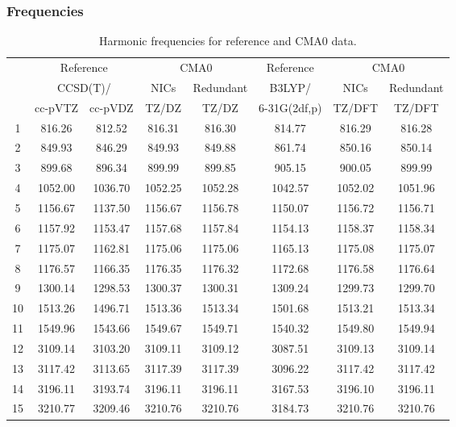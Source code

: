 \documentclass[10pt,oneside]{article}
\begin{document}
\begin{table}[h!]
\subsubsection*{Frequencies}
\centering
\caption{Harmonic frequencies for reference and CMA0 data.}
\begin{tabular}{cccccccc}
\toprule
{} & \multicolumn{2}{c}{Reference} & \multicolumn{2}{c}{CMA0} &    Reference & \multicolumn{2}{c}{CMA0} \\
{} & \multicolumn{2}{c}{CCSD(T)/} &    NICs &  Redundant &       B3LYP/ &    NICs & Redundant \\
{} &   cc-pVTZ & cc-pVDZ &   TZ/DZ &      TZ/DZ & 6-31G(2df,p) &  TZ/DFT &    TZ/DFT \\
\midrule
1  &    816.26 &  812.52 &  816.31 &     816.30 &       814.77 &  816.29 &    816.28 \\
2  &    849.93 &  846.29 &  849.93 &     849.88 &       861.74 &  850.16 &    850.14 \\
3  &    899.68 &  896.34 &  899.99 &     899.85 &       905.15 &  900.05 &    899.99 \\
4  &   1052.00 & 1036.70 & 1052.25 &    1052.28 &      1042.57 & 1052.02 &   1051.96 \\
5  &   1156.67 & 1137.50 & 1156.67 &    1156.78 &      1150.07 & 1156.72 &   1156.71 \\
6  &   1157.92 & 1153.47 & 1157.68 &    1157.84 &      1154.13 & 1158.37 &   1158.34 \\
7  &   1175.07 & 1162.81 & 1175.06 &    1175.06 &      1165.13 & 1175.08 &   1175.07 \\
8  &   1176.57 & 1166.35 & 1176.35 &    1176.32 &      1172.68 & 1176.58 &   1176.64 \\
9  &   1300.14 & 1298.53 & 1300.37 &    1300.31 &      1309.24 & 1299.73 &   1299.70 \\
10 &   1513.26 & 1496.71 & 1513.36 &    1513.34 &      1501.68 & 1513.21 &   1513.34 \\
11 &   1549.96 & 1543.66 & 1549.67 &    1549.71 &      1540.32 & 1549.80 &   1549.94 \\
12 &   3109.14 & 3103.20 & 3109.11 &    3109.12 &      3087.51 & 3109.13 &   3109.14 \\
13 &   3117.42 & 3113.65 & 3117.39 &    3117.39 &      3096.22 & 3117.42 &   3117.42 \\
14 &   3196.11 & 3193.74 & 3196.11 &    3196.11 &      3167.53 & 3196.10 &   3196.11 \\
15 &   3210.77 & 3209.46 & 3210.76 &    3210.76 &      3184.73 & 3210.76 &   3210.76 \\
\bottomrule
\end{tabular}
\end{table}
\end{document}
